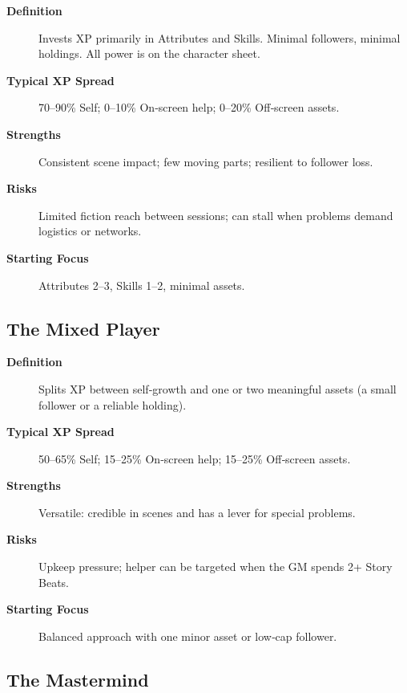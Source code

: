 \begin{description}
    \item[\textbf{Definition}] Invests XP primarily in Attributes and Skills. Minimal followers, minimal holdings. All power is on the character sheet.
    \item[\textbf{Typical XP Spread}] 70--90\% Self; 0--10\% On‑screen help; 0--20\% Off‑screen assets.
    \item[\textbf{Strengths}] Consistent scene impact; few moving parts; resilient to follower loss.
    \item[\textbf{Risks}] Limited fiction reach between sessions; can stall when problems demand logistics or networks.
    \item[\textbf{Starting Focus}] Attributes 2--3, Skills 1--2, minimal assets.
\end{description}

\subsection{The Mixed Player}\label{subsec:mixed_archetype}

\begin{description}
    \item[\textbf{Definition}] Splits XP between self‑growth and one or two meaningful assets (a small follower or a reliable holding).
    \item[\textbf{Typical XP Spread}] 50--65\% Self; 15--25\% On‑screen help; 15--25\% Off‑screen assets.
    \item[\textbf{Strengths}] Versatile: credible in scenes and has a lever for special problems.
    \item[\textbf{Risks}] Upkeep pressure; helper can be targeted when the GM spends 2+ Story Beats.
    \item[\textbf{Starting Focus}] Balanced approach with one minor asset or low‑cap follower.
\end{description}

\subsection{The Mastermind}\label{subsec:mastermind_archetype}

